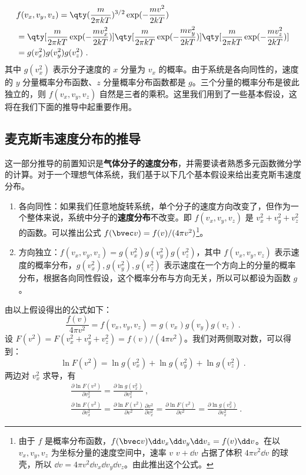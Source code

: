 \begin{equation}
\begin{aligned}
&f(v_x,v_y,v_z)=\qty(\frac{m}{2\pi k T})^{3/2}\exp(-\frac{mv^2}{2kT})\\
&=\qty[\frac{m}{2\pi kT}\exp(-\frac{mv_x^2}{2kT})]\qty[\frac{m}{2\pi kT}\exp(-\frac{mv_y^2}{2kT})]\qty[\frac{m}{2\pi kT}\exp(-\frac{mv_z^2}{2kT})]\\
&=g(v_x^2)g(v_y^2)g(v_z^2)~.
\end{aligned}
\end{equation}
其中 $g(v_x^2)$ 表示分子速度的 $x$ 分量为 $v_x$ 的概率。由于系统是各向同性的，速度的 $y$ 分量概率分布函数、$z$ 分量概率分布函数都是 $g$。三个分量的概率分布是彼此独立的，则 $f(v_x,v_y,v_z)$ 自然是三者的乘积。这里我们用到了一些基本假设，这将在我们下面的推导中起重要作用。

\subsection{麦克斯韦速度分布的推导}
这一部分推导的前置知识是\textbf{气体分子的速度分布}，并需要读者熟悉多元函数微分学的计算。对于一个理想气体系统，我们基于以下几个基本假设来给出麦克斯韦速度分布。

\begin{enumerate}
\item 各向同性：如果我们任意地旋转系统，单个分子的速度方向改变了，但作为一个整体来说，系统中分子的\textbf{速度分布}不改变。即 $f(v_x,v_y,v_z)$ 是 $v_x^2+v_y^2+v_z^2$ 的函数。可以推出公式 $f(\bvec v)=f(v)/(4\pi v^2)$\footnote{由于 $f$ 是概率分布函数，$f(\bvec v)\dd v_x\dd v_y\dd v_z=f(v)\dd v$。在以 $v_x,v_y,v_z$ 为坐标分量的速度空间中，速率 $v\text{~}v+\dd v$ 占据了体积 $4\pi v^2\dd v$ 的球壳，所以 $\dd v=4\pi v^2 \dd v_x\dd v_y\dd v_z$。由此推出这个公式。}。

\item 方向独立：$f(v_x,v_y,v_z)=g(v_x^2)g(v_y^2)g(v_z^2)$，其中 $f(v_x,v_y,v_z)$ 表示速度的概率分布，$g(v_x^2),g(v_y^2),g(v_z^2)$ 表示速度在一个方向上的分量的概率分布，根据各向同性假设，这个概率分布与方向无关，所以可以都设为函数 $g$。
\end{enumerate}

由以上假设得出的公式如下：
\begin{equation}
\frac{f(v)}{4\pi v^2}=f(v_x,v_y,v_z)=g(v_x)g(v_y)g(v_z)~.
\end{equation}
设 $F(v^2)=F(v_x^2+v_y^2+v_z^2)=f(v)/(4\pi v^2)$。我们对两侧取对数，可以得到：
\begin{equation}
\ln F(v^2)=\ln g(v_x^2)+\ln g(v_y^2)+\ln g(v_z^2)~.
\end{equation}
两边对 $v_x^2$ 求导，有
\begin{equation}
\begin{aligned}
&\frac{\partial \ln F(v^2)}{\partial v_x^2}=\frac{\partial \ln g(v_x^2)}{\partial v_x^2}~,
\\
&\frac{\partial \ln F(v^2)}{\partial v_x^2}=\frac{\partial \ln F(v^2)}{\partial v^2} \frac{\partial v^2}{\partial v_x^2}=\frac{\partial \ln F(v^2)}{\partial v^2}=\frac{\partial \ln g(v_x^2)}{\partial v_x^2}~.
\end{aligned}
\end{equation}

